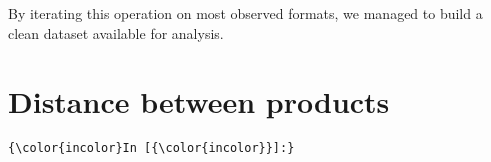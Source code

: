 \documentclass{article}
\begin{document}
    By iterating this operation on most observed formats, we managed to
build a clean dataset available for analysis.


    \section{Distance between products}


    \begin{Verbatim}[commandchars=\\\{\}]
{\color{incolor}In [{\color{incolor}}]:} 
\end{Verbatim}


    
    
    
    
\end{document}
